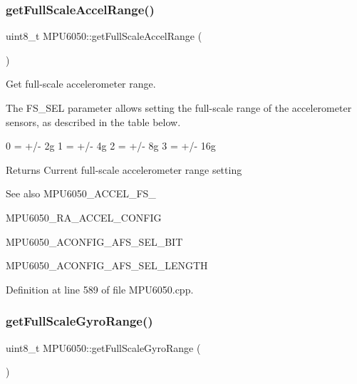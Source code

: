 \subsubsection{\texorpdfstring{getFullScaleAccelRange()}{getFullScaleAccelRange()}}
{\footnotesize\ttfamily uint8\+\_\+t M\+P\+U6050\+::get\+Full\+Scale\+Accel\+Range (\begin{DoxyParamCaption}{ }\end{DoxyParamCaption})}



Get full-\/scale accelerometer range. 

The F\+S\+\_\+\+S\+EL parameter allows setting the full-\/scale range of the accelerometer sensors, as described in the table below.


\begin{DoxyPre}
0 = +/- 2g
1 = +/- 4g
2 = +/- 8g
3 = +/- 16g
\end{DoxyPre}


\begin{DoxyReturn}{Returns}
Current full-\/scale accelerometer range setting 
\end{DoxyReturn}
\begin{DoxySeeAlso}{See also}
M\+P\+U6050\+\_\+\+A\+C\+C\+E\+L\+\_\+\+F\+S\+\_ 

M\+P\+U6050\+\_\+\+R\+A\+\_\+\+A\+C\+C\+E\+L\+\_\+\+C\+O\+N\+F\+IG 

M\+P\+U6050\+\_\+\+A\+C\+O\+N\+F\+I\+G\+\_\+\+A\+F\+S\+\_\+\+S\+E\+L\+\_\+\+B\+IT 

M\+P\+U6050\+\_\+\+A\+C\+O\+N\+F\+I\+G\+\_\+\+A\+F\+S\+\_\+\+S\+E\+L\+\_\+\+L\+E\+N\+G\+TH 
\end{DoxySeeAlso}


Definition at line 589 of file M\+P\+U6050.\+cpp.

\mbox{\label{classMPU6050_acb1fa088d43d76230106a3226f343013}} 
\subsubsection{\texorpdfstring{getFullScaleGyroRange()}{getFullScaleGyroRange()}}
{\footnotesize\ttfamily uint8\+\_\+t M\+P\+U6050\+::get\+Full\+Scale\+Gyro\+Range (\begin{DoxyParamCaption}{ }\end{DoxyParamCaption})}



